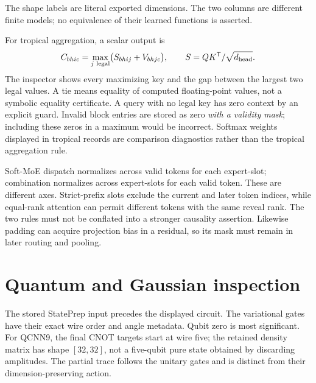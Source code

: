 \documentclass[11pt,oneside,openany]{book}
\theoremstyle{definition}\newtheorem{definition}[theorem]{Definition}
\theoremstyle{remark}\newtheorem{remark}[theorem]{Remark}
\begin{document}
\begin{center}
\end{center}
The shape labels are literal exported dimensions. The two columns are
different finite models; no equivalence of their learned functions is
asserted.

For tropical aggregation, a scalar output is
\[
 C_{bhic}=\max_{j\text{ legal}}
       \bigl(S_{bhij}+V_{bhjc}\bigr),\qquad
 S=QK^{\mathsf{T}}/\sqrt{d_{\rm head}}.
\]
The inspector shows every maximizing key and the gap between the largest
two legal values. A tie means equality of computed floating-point values,
not a symbolic equality certificate. A query with no legal key has zero
context by an explicit guard. Invalid block entries are stored as zero
\emph{with a validity mask}; including these zeros in a maximum would be
incorrect. Softmax weights displayed in tropical records are comparison
diagnostics rather than the tropical aggregation rule.

Soft-MoE dispatch normalizes across valid tokens for each expert-slot;
combination normalizes across expert-slots for each valid token. These are
different axes. Strict-prefix slots exclude the current and later token
indices, while equal-rank attention can permit different tokens with the
same reveal rank. The two rules must not be conflated into a stronger
causality assertion. Likewise padding can acquire projection bias in a
residual, so its mask must remain in later routing and pooling.

\section{Quantum and Gaussian inspection}
The stored StatePrep input precedes the displayed circuit. The variational
gates have their exact wire order and angle metadata. Qubit zero is most
significant. For QCNN9, the final CNOT targets start at wire five; the
retained density matrix has shape $[32,32]$, not a five-qubit pure state
obtained by discarding amplitudes. The partial trace follows the unitary
gates and is distinct from their dimension-preserving action.
\end{document}
